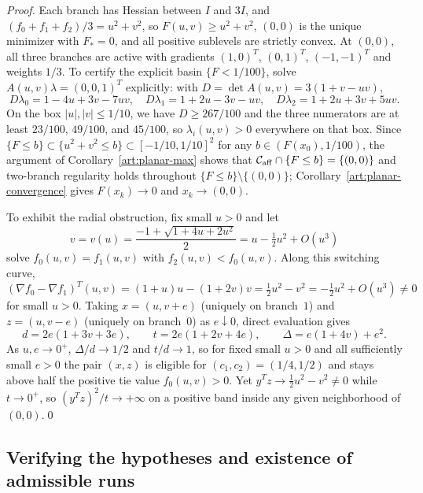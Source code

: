 \begin{proof}
Each branch has Hessian between $I$ and $3I$, and $(f_0+f_1+f_2)/3=u^2+v^2$, so
$F(u,v)\ge u^2+v^2$, $(0,0)$ is the unique minimizer with $F_*=0$, and all
positive sublevels are strictly convex. At $(0,0)$, all three branches are
active with gradients $(1,0)^T$, $(0,1)^T$, $(-1,-1)^T$ and weights $1/3$.
To certify the explicit basin $\{F<1/100\}$, solve $A(u,v)\lambda=(0,0,1)^T$
explicitly: with $D=\det A(u,v)=3(1+v-uv)$,
\[
 D\lambda_0=1-4u+3v-7uv,\quad
 D\lambda_1=1+2u-3v-uv,\quad
 D\lambda_2=1+2u+3v+5uv.
\]
On the box $|u|,|v|\le1/10$, we have $D\ge267/100$ and the three numerators are
at least $23/100$, $49/100$, and $45/100$, so $\lambda_i(u,v)>0$ everywhere on
that box. Since $\{F\le b\}\subset\{u^2+v^2\le b\}\subset[-1/10,1/10]^2$ for any
$b\in(F(x_0),1/100)$, the argument of Corollary~\ref{art:planar-max} shows that
$\mathcal C_{\rm aff}\cap\{F\le b\}=\{(0,0)\}$ and two-branch regularity holds
throughout $\{F\le b\}\setminus\{(0,0)\}$; Corollary~\ref{art:planar-convergence}
gives $F(x_k)\to0$ and $x_k\to(0,0)$.

To exhibit the radial obstruction, fix small $u>0$ and let
\[
 v=v(u)=\frac{-1+\sqrt{1+4u+2u^2}}2=u-\tfrac12u^2+O(u^3)
\]
solve $f_0(u,v)=f_1(u,v)$ with $f_2(u,v)<f_0(u,v)$. Along this switching curve,
\[
 (\nabla f_0-\nabla f_1)^T(u,v)
 =(1+u)u-(1+2v)v=\tfrac12u^2-v^2=-\tfrac12u^2+O(u^3)\ne0
\]
for small $u>0$. Taking $x=(u,v+e)$ (uniquely on branch~$1$) and $z=(u,v-e)$
(uniquely on branch~$0$) as $e\downarrow0$, direct evaluation gives
\[
 d=2e(1+3v+3e),\qquad t=2e(1+2v+4e),\qquad \Delta=e(1+4v)+e^2.
\]
As $u,e\to0^+$, $\Delta/d\to1/2$ and $t/d\to1$, so for fixed small $u>0$ and all
sufficiently small $e>0$ the pair $(x,z)$ is eligible for $(c_1,c_2)=(1/4,1/2)$
and stays above half the positive tie value $f_0(u,v)>0$. Yet
$y^Tz\to\tfrac12u^2-v^2\ne0$ while $t\to0^+$, so $(y^Tz)^2/t\to+\infty$ on a
positive band inside any given neighborhood of $(0,0)$.\qed
\end{proof}

\subsection{Verifying the hypotheses and existence of admissible runs}

